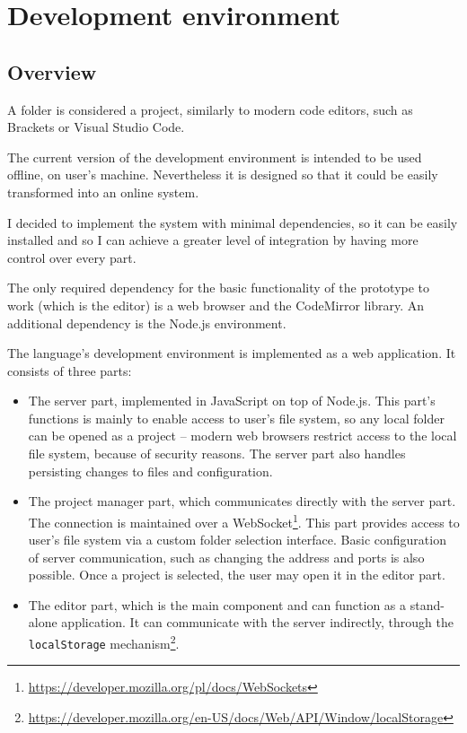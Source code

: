 \chapter{Development environment}\label{chap:editor}

\section{Overview}
A folder is considered a project, similarly to modern code editors, such as Brackets or Visual Studio Code.

The current version of the development environment is intended to be used offline, on user's machine. Nevertheless it is designed so that it could be easily transformed into an online system.

I decided to implement the system with minimal dependencies, so it can be easily installed and so I can achieve a greater level of integration by having more control over every part.

The only required dependency for the basic functionality of the prototype to work (which is the editor) is a web browser and the CodeMirror library. An additional dependency is the Node.js environment.


The language's development environment is implemented as a web application. It consists of three parts:
\begin{itemize}
    \item The server part, implemented in JavaScript on top of Node.js. This part's functions is mainly to enable access to user's file system, so any local folder can be opened as a project -- modern web browsers restrict access to the local file system, because of security reasons. The server part also handles persisting changes to files and configuration.
    \item The project manager part, which communicates directly with the server part. The connection is maintained over a WebSocket\footnote{\url{https://developer.mozilla.org/pl/docs/WebSockets}}. This part provides access to user's file system via a custom folder selection interface. Basic configuration of server communication, such as changing the address and ports is also possible. Once a project is selected, the user may open it in the editor part.
    \item The editor part, which is the main component and can function as a stand-alone application. It can communicate with the server indirectly, through the \texttt{localStorage} mechanism\footnote{\url{https://developer.mozilla.org/en-US/docs/Web/API/Window/localStorage}}.
\end{itemize}


